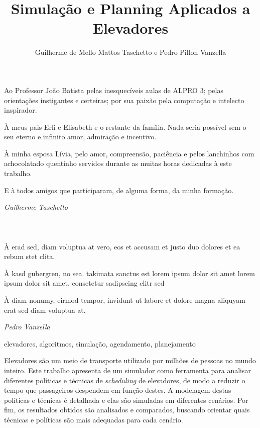 \documentclass[portuguese,oneside]{tcc}
\author{Guilherme de Mello Mattos Taschetto e Pedro Pillon Vanzella}
\title{Simulação e Planning Aplicados a Elevadores}
      {Simulation and Planning Applied to Elevators}
\begin{document}

\begin{agradecimentos}

Ao Professor João Batista pelas inesquecíveis aulas de ALPRO 3; pelas
orientações instigantes e certeiras; por sua paixão pela computação e intelecto
inspirador.

À meus pais Erli e Elisabeth e o restante da família. Nada seria possível sem o
seu eterno e infinito amor, admiração e incentivo.

À minha esposa Lívia, pelo amor, compreensão, paciência e pelos lanchinhos com
achocolatado quentinho servidos durante as muitas horas dedicadas à este trabalho.

E à todos amigos que participaram, de alguma forma, da minha formação.

\hfill \textit{Guilherme Taschetto} \\ \\ \\ \\

À erad sed, diam voluptua at vero, eos et accusam et justo duo
dolores et ea rebum stet clita.

À kasd gubergren, no sea. takimata sanctus est lorem ipsum dolor sit
amet lorem ipsum dolor sit amet. consetetur sadipscing elitr sed

À diam nonumy, eirmod tempor, invidunt ut labore et dolore magna
aliquyam erat sed diam voluptua at.

\hfill \textit{Pedro Vanzella}
\end{agradecimentos}

\begin{resumo}{elevadores, algoritmos, simulação, agendamento, planejamento}

Elevadores são um meio de transporte utilizado por milhões de pessoas no mundo
inteiro. Este trabalho apresenta de um simulador como ferramenta para analisar
diferentes políticas e técnicas de \textit{scheduling} de elevadores, de modo a
reduzir o tempo que passageiros despendem em função destes. A modelagem destas
políticas e técnicas é detalhada e elas são simuladas em diferentes cenários.
Por fim, os resultados obtidos são analisados e comparados, buscando orientar
quais técnicas e políticas são mais adequadas para cada cenário.

\end{resumo}
\end{document}
